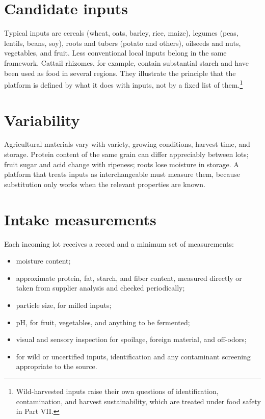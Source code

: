 \documentclass[11pt,openany]{book}
\theoremstyle{definition}
\begin{document}
\section{Candidate inputs}

Typical inputs are cereals (wheat, oats, barley, rice, maize), legumes (peas, lentils, beans, soy), roots and tubers (potato and others), oilseeds and nuts, vegetables, and fruit. Less conventional local inputs belong in the same framework. Cattail rhizomes, for example, contain substantial starch and have been used as food in several regions. They illustrate the principle that the platform is defined by what it does with inputs, not by a fixed list of them.\footnote{Wild-harvested inputs raise their own questions of identification, contamination, and harvest sustainability, which are treated under food safety in Part VII.}

\section{Variability}

Agricultural materials vary with variety, growing conditions, harvest time, and storage. Protein content of the same grain can differ appreciably between lots; fruit sugar and acid change with ripeness; roots lose moisture in storage. A platform that treats inputs as interchangeable must measure them, because substitution only works when the relevant properties are known.

\section{Intake measurements}

Each incoming lot receives a record and a minimum set of measurements:

\begin{itemize}
\item moisture content;
\item approximate protein, fat, starch, and fiber content, measured directly or taken from supplier analysis and checked periodically;
\item particle size, for milled inputs;
\item pH, for fruit, vegetables, and anything to be fermented;
\item visual and sensory inspection for spoilage, foreign material, and off-odors;
\item for wild or uncertified inputs, identification and any contaminant screening appropriate to the source.
\end{itemize}
\end{document}
